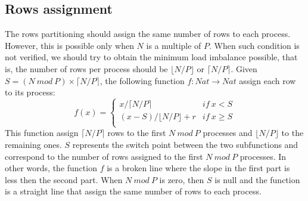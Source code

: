 \documentclass{article}
\begin{document}
\subsection{Rows assignment} \label{sec:rowsassignment}
The rows partitioning should assign the same number of rows to each process. However, this is possible only when $N$ is a multiple of $P$. When such condition is not verified, we should try to obtain the minimum load imbalance possible, that is, the number of rows per process should be $\lfloor N/P \rfloor$ or $\lceil N/P \rceil$. Given $S = (N~mod~P) \times \lceil N/P \rceil$, the following function $f: Nat \to Nat$ assign each row to its process:
\[
f(x)=
\begin{cases}
x / \lceil N/P \rceil & if~x < S \\
(x - S) / \lfloor N/P \rfloor + r & if~x \geq S \\
\end{cases}
\]
This function assign $\lceil N/P \rceil$ rows to the first $N~mod~P$ processes and $\lfloor N/P \rfloor$ to the remaining ones. $S$ represents the switch point between the two subfunctions and correspond to the number of rows assigned to the first $N~mod~P$ processes. In other words, the function $f$ is a broken line where the slope in the first part is less then the second part. When $N~mod~P$ is zero, then $S$ is null and the function is a straight line that assign the same number of rows to each process.
\end{document}
